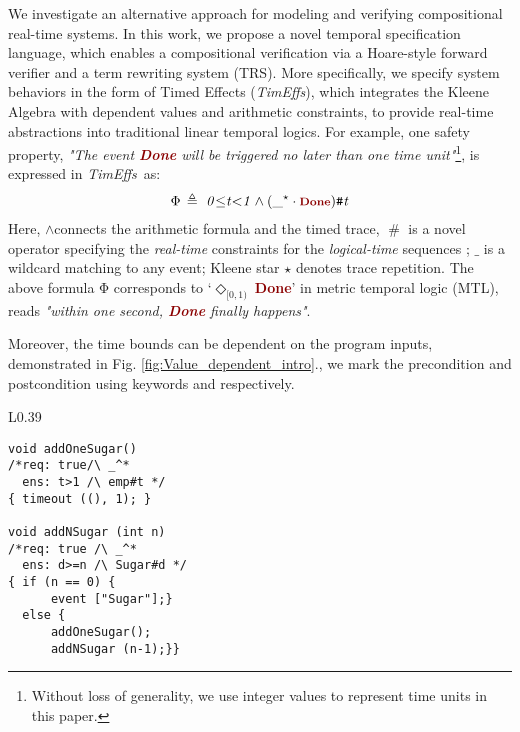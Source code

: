 \documentclass[acmsmall,10pt,review]{acmart}
\newcommand{\timedEffects}{\emph{TimEffs}}
\newcommand{\effect}{{\ensuremath{\mathrm{\Phi}}}}
\newcommand{\anyevent}[1]{{\textcolor{darkred}
{{\textbf{\footnotesize #1}}}}}
\newcommand{\code}[1]{{\tt{\ensuremath{\m{#1}}}}}
\newcommand{\m}{\mathit}
\newcommand{\mysharp}{{\mathrel{\texttt{\#}}}}
\def\defeq{\ensuremath{\,\triangleq}}
\newcommand\figref[1]{Fig. \textcolor{black}{\ref{#1}}.}
\begin{document}
We investigate an alternative approach for modeling and verifying 
compositional real-time systems. In this work, 
we propose a novel temporal specification language, 
which enables a compositional verification via a  Hoare-style 
forward verifier and a term rewriting system (TRS). 
More specifically, we specify system behaviors in the form of 
{Timed Effects} (\timedEffects), which integrates the Kleene Algebra 
with dependent values and arithmetic constraints, 
to 
provide real-time abstractions into traditional linear temporal logics. 
For example, one safety property, \textit{"The event \anyevent{Done} 
will be triggered no later than one time unit"}\footnote{Without loss of generality, 
we use integer values to represent time units in this 
paper.%
}, is expressed in \timedEffects\ as: 
\begin{align*}
  \code{\effect \defeq \  0 {\leq} t {<}1 \wedge ({\_^\star} \cdot \anyevent{Done} ) \mysharp  t}
\end{align*}  
Here, \code \wedge  connects the arithmetic formula and the timed trace, \code{\mysharp } is a novel operator specifying the \emph{real-time} 
constraints for the \emph{logical-time} sequences \cite{DBLP:conf/fdl/HanxledenBG17}; 
\code{\_} is a wildcard matching to any event; 
Kleene star \code{\star} denotes trace repetition.
The above formula \code{\effect} corresponds to `\code{\Diamond_{[0, 1)}\ }\anyevent{Done}' 
in metric temporal logic (MTL), reads \textit{"within one second, 
\anyevent{Done} finally happens"}. 

Moreover, the time bounds 
can be dependent on the program inputs, demonstrated in \figref{fig:Value_dependent_intro}, we mark the precondition and postcondition
using keywords {\color{darklavender}\code{\emph{req:}}} and {\color{darklavender}\code{\emph{ens:}}} respectively. 


\begin{wrapfigure}{L}{0.39\columnwidth}
\begin{lstlisting}[name=coffee]
void addOneSugar() 
/*req: true/\ _^*
  ens: t>1 /\ emp#t */ 
{ timeout ((), 1); }

void addNSugar (int n) 
/*req: true /\ _^*
  ens: d>=n /\ Sugar#d */
{ if (n == 0) { 
      event ["Sugar"];} 
  else {
      addOneSugar();
      addNSugar (n-1);}} 
\end{lstlisting}
\caption{Value-dependent specification.} 
\label{fig:Value_dependent_intro}
\vspace{0mm}
\end{wrapfigure}
\end{document}
